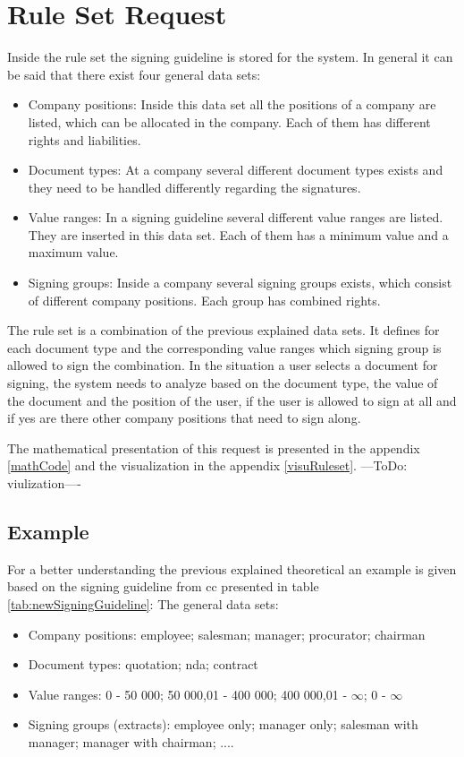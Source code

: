 \section{Rule Set Request}\label{sec:ruleRequest}
Inside the rule set the signing guideline is stored for the system. In general it can be said that there exist four general data sets:
\begin{itemize}
	\item Company positions: \newline
	Inside this data set all the positions of a company are listed, which can be allocated in the company. Each of them has different rights and liabilities.
	\item Document types: \newline
	At a company several different document types exists and they need to be handled differently regarding the signatures. 
	\item Value ranges: \newline
	In a signing guideline several different value ranges are listed. They are inserted in this data set. Each of them has a minimum value and a maximum value.
	\item Signing groups: \newline
	Inside a company several signing groups exists, which consist of different company positions. Each group has combined rights.
\end{itemize}

The rule set is a combination of the previous explained data sets. It defines for each document type and the corresponding value ranges which signing group is allowed to sign the combination. \newline
In the situation a user selects a document for signing, the system needs to analyze based on the document type, the value of the document and the position of the user, if the user is allowed to sign at all and if yes are there other company positions that need to sign along. 

The mathematical presentation of this request is presented in the appendix \ref{mathCode} and the visualization in the appendix \ref{visuRuleset}. ---ToDo: viulization----

\subsection*{Example}
For a better understanding the previous explained theoretical an example is given based on the signing guideline from \gls{cc} presented in table \ref{tab:newSigningGuideline}: \newline
The general data sets:
\begin{itemize}
	\item Company positions: employee; salesman; manager; procurator; chairman
	\item Document types: quotation; \gls{nda}; contract
	\item Value ranges: 0 - 50 000; 50 000,01 - 400 000; 400 000,01 - $\infty$; 0 - $\infty$
	\item Signing groups (extracts): employee only; manager only; salesman with manager; manager with chairman; ....
\end{itemize}

